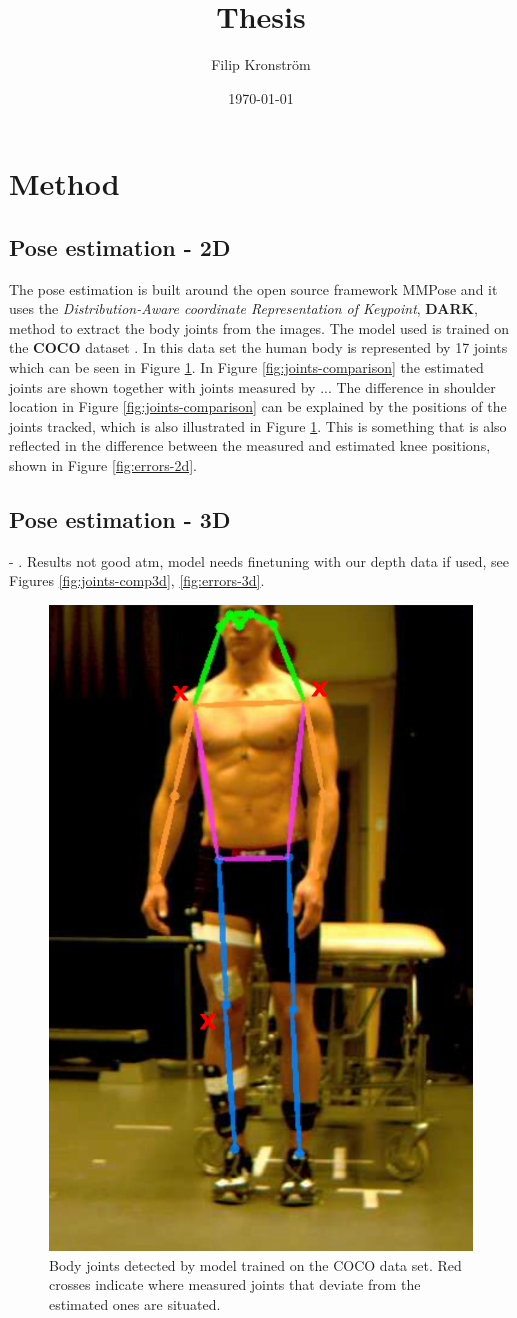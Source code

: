 \documentclass{article}
\title{Thesis}
\author{Filip Kronström}
\date{\today}
\begin{document}
\maketitle
\section{Method}
\subsection{Pose estimation - 2D}
The pose estimation is built around the open source framework MMPose \cite{mmpose} and it uses the \emph{Distribution-Aware coordinate Representation of Keypoint}, \textbf{DARK}, method \cite{Zhang2020} to extract the body joints from the images. The model used is trained on the \textbf{COCO} dataset \cite{Lin2014}. In this data set the human body is represented by 17 joints which can be seen in Figure \ref{fig:COCO-joints}. In Figure \ref{fig:joints-comparison} the estimated joints are shown together with joints measured by ... The difference in shoulder location in Figure \ref{fig:joints-comparison} can be explained by the positions of the joints tracked, which is also illustrated in Figure \ref{fig:COCO-joints}. This is something that is also reflected in the difference between the measured and estimated knee positions, shown in Figure \ref{fig:errors-2d}.

\subsection{Pose estimation - 3D}
- \cite{Pavllo2019}. Results not good atm, model needs finetuning with our depth data if used, see Figures \ref{fig:joints-comp3d}, \ref{fig:errors-3d}.

\begin{figure}
  \centering
  \includegraphics[height=0.8\textwidth]{figs/joint-36.png}
  \caption{Body joints detected by model trained on the COCO data set. Red crosses indicate where measured joints that deviate from the estimated ones are situated.}
  \label{fig:COCO-joints}
\end{figure}
\end{document}
